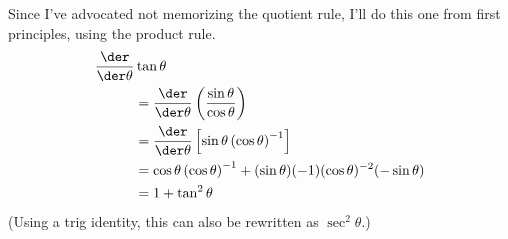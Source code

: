 Since I've advocated not memorizing the quotient rule, I'll do this one from first principles,
using the product rule.
\begin{align*}
  \frac{\der}{\der \theta}& \tan\theta \\
        &=   \frac{\der}{\der \theta}\left(\frac{\sin\theta}{\cos\theta}\right) \\
        &=   \frac{\der}{\der \theta}\left[\sin\theta\left(\cos\theta\right)^{-1}\right] \\
        &=   \cos\theta\left(\cos\theta\right)^{-1}+(\sin\theta)(-1)(\cos\theta)^{-2}(-\sin\theta)\\
        &=   1+\tan^2\theta
\end{align*}
(Using a trig identity, this can also be rewritten as $\sec^2\theta$.)
